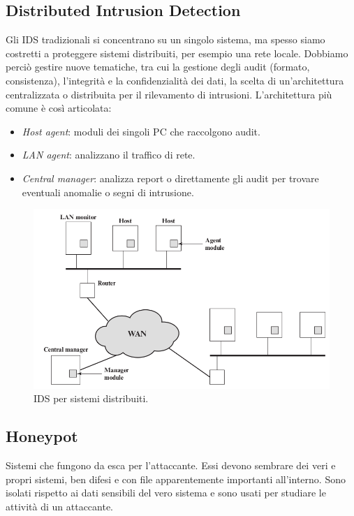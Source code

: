 \documentclass[a4paper, 11pt, twoside, openright, fleqn]{report}
\begin{document}
\subsection{Distributed Intrusion Detection}
Gli IDS tradizionali si concentrano su un singolo sistema, ma spesso siamo costretti a proteggere sistemi distribuiti, per esempio una rete locale. Dobbiamo perciò gestire nuove tematiche, tra cui la gestione degli audit (formato, consistenza), l'integrità e la confidenzialità dei dati, la scelta di un'architettura centralizzata o distribuita per il rilevamento di intrusioni. L'architettura più comune è così articolata:
\begin{itemize}
	\item \emph{Host agent}: moduli dei singoli PC che raccolgono audit.
	\item \emph{LAN agent}: analizzano il traffico di rete.
	\item \emph{Central manager}: analizza report o direttamente gli audit per trovare eventuali anomalie o segni di intrusione.
\end{itemize}

\begin{figure}[htp]
	\centering
	\includegraphics[width=.9\textwidth]{images/LANIDS}
	\caption{IDS per sistemi distribuiti.}
\end{figure}

\subsection{Honeypot}
Sistemi che fungono da esca per l'attaccante. Essi devono sembrare dei veri e propri sistemi, ben difesi e con file apparentemente importanti all'interno. Sono isolati rispetto ai dati sensibili del vero sistema e sono usati per studiare le attività di un attaccante.
\end{document}
